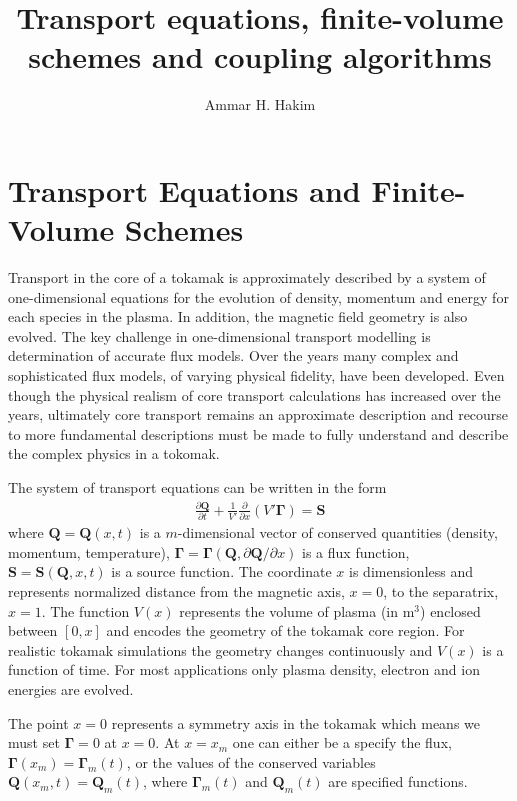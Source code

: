 \documentclass[11pt]{amsart}
\title{Transport equations, finite-volume schemes and coupling
  algorithms}%
\author{Ammar H. Hakim}%
\date{}
\newcommand{\pfrac}[2]{\frac{\partial #1}{\partial #2}}
\newcommand{\pfraca}[1]{\frac{\partial}{\partial #1}}
\newcommand{\pfracb}[2]{\partial #1/\partial #2}
\newcommand{\mvec}[1]{\mathbf{#1}}
\newcommand{\gvec}[1]{\boldsymbol{#1}}
\theoremstyle{example}
\begin{document}
\maketitle

\section{Transport Equations and Finite-Volume Schemes}

Transport in the core of a tokamak is approximately described by a
system of one-dimensional equations for the evolution of density,
momentum and energy for each species in the plasma. In addition, the
magnetic field geometry is also evolved. The key challenge in
one-dimensional transport modelling is determination of accurate flux
models. Over the years many complex and sophisticated flux models, of
varying physical fidelity, have been developed. Even though the
physical realism of core transport calculations has increased over the
years, ultimately core transport remains an approximate description
and recourse to more fundamental descriptions must be made to fully
understand and describe the complex physics in a tokomak.

The system of transport equations can be written in the form
\begin{align}
  \pfrac{\mvec{Q}}{t} 
  + \frac{1}{V'} \pfraca{x} \left( V' \gvec{\Gamma} \right) = \mvec{S}
\end{align}
where $\mvec{Q} = \mvec{Q}(x,t)$ is a $m$-dimensional vector of
conserved quantities (density, momentum, temperature), $\gvec{\Gamma}
= \gvec{\Gamma}(\mvec{Q},\pfracb{\mvec{Q}}{x})$ is a flux function,
$\mvec{S} = \mvec{S}(\mvec{Q},x,t)$ is a source function. The
coordinate $x$ is dimensionless and represents normalized distance
from the magnetic axis, $x=0$, to the separatrix, $x=1$. The function
$V(x)$ represents the volume of plasma (in m$^3$) enclosed between
$[0,x]$ and encodes the geometry of the tokamak core region. For
realistic tokamak simulations the geometry changes continuously and
$V(x)$ is a function of time. For most applications only plasma
density, electron and ion energies are evolved.

The point $x=0$ represents a symmetry axis in the tokamak which means
we must set $\gvec{\Gamma}=0$ at $x=0$. At $x=x_m$ one can either be a
specify the flux, $\gvec{\Gamma}(x_m)=\gvec{\Gamma}_m(t)$, or the
values of the conserved variables $\mvec{Q}(x_m,t)=\mvec{Q}_m(t)$,
where $\gvec{\Gamma}_m(t)$ and $\mvec{Q}_m(t)$ are specified
functions.
\end{document}
